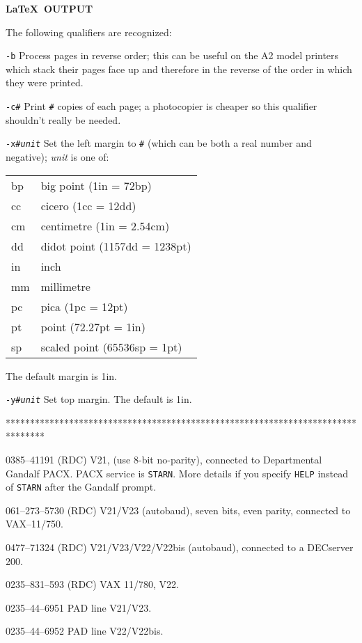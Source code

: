 \newpage

\begin{center}
{\bf \LaTeX\ OUTPUT}
\end{center}

The following qualifiers are recognized:

\begin{list}{}{\settowidth{\labelwidth}{\tt-f\em filename}
\setlength{\leftmargin}{\labelwidth}
\addtolength{\labelwidth}{\labelsep}}
\item[\tt-b] Process pages in reverse order; this can be useful on the A2 model
printers which stack their pages face up and therefore in the reverse of
the order in which they were printed.
\item[\tt-c\#]  Print {\tt\#} copies of each page; a photocopier is cheaper so
this qualifier shouldn't really be needed.
\item[\tt-x\#\it unit] Set the left margin to {\tt\#} (which can be both
a real number and negative); {\it unit} is one of:

\begin{tabular}{ll}
bp &big point (1in = 72bp)\\
cc &cicero (1cc = 12dd)\\
cm &centimetre (1in = 2.54cm)\\
dd &didot point (1157dd = 1238pt)\\
in &inch\\
mm &millimetre\\
pc &pica (1pc = 12pt)\\
pt &point (72.27pt = 1in)\\
sp &scaled point (65536sp = 1pt)
\end{tabular}

The default margin is 1in.
\item[\tt-y\#\it unit] Set top margin. The default is 1in.
\end{list}

********************************************************************************

\newlength{\numlen}
\settowidth{\numlen}{xxxx000--000--0000}
\settowidth{\labelsep}{000}

\begin{list}{}{\setlength{\labelwidth}{\numlen}\setlength{\leftmargin}{\numlen}
\addtolength{\leftmargin}{\labelsep}}
\item[0385--41191] (RDC) V21, (use 8-bit no-parity), connected to
Departmental Gandalf PACX.
PACX service is {\tt STARN}.
More details if you specify {\tt HELP} instead of {\tt STARN} after the Gandalf
prompt.
\item[061--273--5730] (RDC) V21/V23 (autobaud), seven bits, even parity,
connected to VAX--11/750.
\item[0477--71324] (RDC) V21/V23/V22/V22bis (autobaud), connected to a DECserver
200.
\item[0235--831--593] (RDC) VAX 11/780, V22.
\item[0235--44--6951] PAD line V21/V23.
\item[0235--44--6952] PAD line V22/V22bis.
\end{list}

